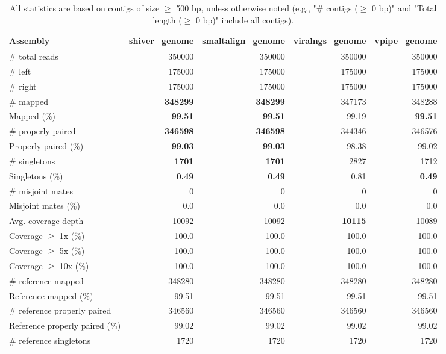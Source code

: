 \documentclass[12pt,a4paper]{article}
\begin{document}
\begin{table}[ht]
\begin{center}
\caption{All statistics are based on contigs of size $\geq$ 500 bp, unless otherwise noted (e.g., "\# contigs ($\geq$ 0 bp)" and "Total length ($\geq$ 0 bp)" include all contigs).}
\begin{tabular}{|l*{4}{|r}|}
\hline
Assembly & shiver\_genome & smaltalign\_genome & viralngs\_genome & vpipe\_genome \\ \hline
\# total reads & 350000 & 350000 & 350000 & 350000 \\ \hline
\# left & 175000 & 175000 & 175000 & 175000 \\ \hline
\# right & 175000 & 175000 & 175000 & 175000 \\ \hline
\# mapped & {\bf 348299} & {\bf 348299} & 347173 & 348288 \\ \hline
Mapped (\%) & {\bf 99.51} & {\bf 99.51} & 99.19 & {\bf 99.51} \\ \hline
\# properly paired & {\bf 346598} & {\bf 346598} & 344346 & 346576 \\ \hline
Properly paired (\%) & {\bf 99.03} & {\bf 99.03} & 98.38 & 99.02 \\ \hline
\# singletons & {\bf 1701} & {\bf 1701} & 2827 & 1712 \\ \hline
Singletons (\%) & {\bf 0.49} & {\bf 0.49} & 0.81 & {\bf 0.49} \\ \hline
\# misjoint mates & 0 & 0 & 0 & 0 \\ \hline
Misjoint mates (\%) & 0.0 & 0.0 & 0.0 & 0.0 \\ \hline
Avg. coverage depth & 10092 & 10092 & {\bf 10115} & 10089 \\ \hline
Coverage $\geq$ 1x (\%) & 100.0 & 100.0 & 100.0 & 100.0 \\ \hline
Coverage $\geq$ 5x (\%) & 100.0 & 100.0 & 100.0 & 100.0 \\ \hline
Coverage $\geq$ 10x (\%) & 100.0 & 100.0 & 100.0 & 100.0 \\ \hline
\# reference mapped & 348280 & 348280 & 348280 & 348280 \\ \hline
Reference mapped (\%) & 99.51 & 99.51 & 99.51 & 99.51 \\ \hline
\# reference properly paired & 346560 & 346560 & 346560 & 346560 \\ \hline
Reference properly paired (\%) & 99.02 & 99.02 & 99.02 & 99.02 \\ \hline
\# reference singletons & 1720 & 1720 & 1720 & 1720 \\ \hline

\end{tabular}
\end{center}
\end{table}
\end{document}
